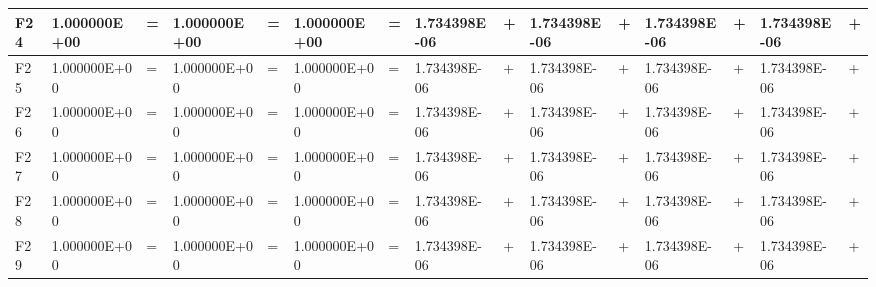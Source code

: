 \documentclass{article} %
\begin{document}
\begin{tabular}{|p{0.3in}|p{0.5in}|p{0.2in}|p{0.5in}|p{0.2in}|p{0.5in}|p{0.2in}|p{0.5in}|p{0.2in}|p{0.5in}|p{0.1in}|p{0.5in}|p{0.1in}|p{0.5in}|p{0.1in}|}
F24 & 1.000000E+00 & = & 1.000000E+00 & = & 1.000000E+00 & = & 1.734398E-06 & + & 1.734398E-06 & + & 1.734398E-06 & + & 1.734398E-06 & + \\ \hline 
F25 & 1.000000E+00 & = & 1.000000E+00 & = & 1.000000E+00 & = & 1.734398E-06 & + & 1.734398E-06 & + & 1.734398E-06 & + & 1.734398E-06 & + \\ \hline 
F26 & 1.000000E+00 & = & 1.000000E+00 & = & 1.000000E+00 & = & 1.734398E-06 & + & 1.734398E-06 & + & 1.734398E-06 & + & 1.734398E-06 & + \\ \hline 
F27 & 1.000000E+00 & = & 1.000000E+00 & = & 1.000000E+00 & = & 1.734398E-06 & + & 1.734398E-06 & + & 1.734398E-06 & + & 1.734398E-06 & + \\ \hline 
F28 & 1.000000E+00 & = & 1.000000E+00 & = & 1.000000E+00 & = & 1.734398E-06 & + & 1.734398E-06 & + & 1.734398E-06 & + & 1.734398E-06 & + \\ \hline 
F29 & 1.000000E+00 & = & 1.000000E+00 & = & 1.000000E+00 & = & 1.734398E-06 & + & 1.734398E-06 & + & 1.734398E-06 & + & 1.734398E-06 & + \\ \hline 
\end{tabular}
\end{document}
